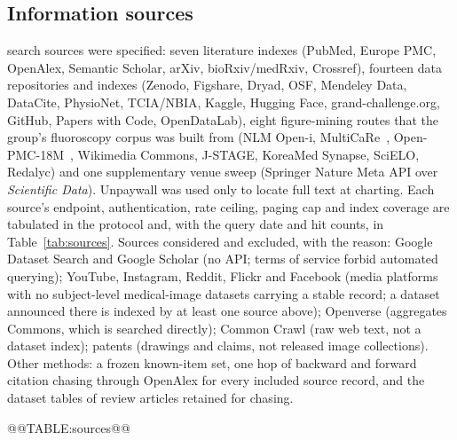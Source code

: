 \documentclass[11pt,a4paper]{article}
\newcommand{\tabref}[1]{Table~\ref{tab:#1}}
\begin{document}
\subsection{Information sources}\label{sec:sources}
\numwordSourcesPlanned{} search sources were specified: seven literature indexes (PubMed, Europe PMC, OpenAlex, Semantic Scholar, arXiv, bioRxiv/medRxiv, Crossref), fourteen data repositories and indexes (Zenodo, Figshare, Dryad, OSF, Mendeley Data, DataCite, PhysioNet, TCIA/NBIA, Kaggle, Hugging Face, grand-challenge.org, GitHub, Papers with Code, OpenDataLab), eight figure-mining routes that the group's fluoroscopy corpus was built from (NLM Open-i, MultiCaRe~\citep{multicare2023}, Open-PMC-18M~\citep{openpmc18m}, Wikimedia Commons, J-STAGE, KoreaMed Synapse, SciELO, Redalyc) and one supplementary venue sweep (Springer Nature Meta API over \emph{Scientific Data}). Unpaywall was used only to locate full text at charting. Each source's endpoint, authentication, rate ceiling, paging cap and index coverage are tabulated in the protocol and, with the query date and hit counts, in \tabref{sources}. Sources considered and excluded, with the reason: Google Dataset Search and Google Scholar (no API; terms of service forbid automated querying); YouTube, Instagram, Reddit, Flickr and Facebook (media platforms with no subject-level medical-image datasets carrying a stable record; a dataset announced there is indexed by at least one source above); Openverse (aggregates Commons, which is searched directly); Common Crawl (raw web text, not a dataset index); patents (drawings and claims, not released image collections). Other methods: a frozen known-item set, one hop of backward and forward citation chasing through OpenAlex for every included source record, and the dataset tables of review articles retained for chasing.

@@TABLE:sources@@
\end{document}
